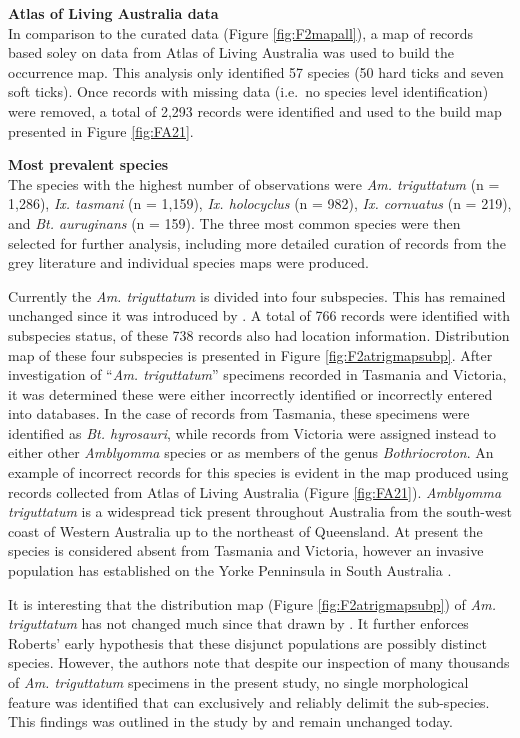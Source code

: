 \documentclass[a4paper, nobind]{templates/ociamthesis}
\begin{document}
\textbf{Atlas of Living Australia data}\\
In comparison to the curated data (Figure \ref{fig:F2mapall}), a map of records based soley on data from Atlas of Living Australia was used to build the occurrence map.
This analysis only identified 57 species (50 hard ticks and seven soft ticks).
Once records with missing data (i.e.~no species level identification) were removed, a total of 2,293 records were identified and used to the build map presented in Figure \ref{fig:FA21}.

\textbf{Most prevalent species}\\
The species with the highest number of observations were \emph{Am. triguttatum} (n = 1,286), \emph{Ix. tasmani} (n = 1,159), \emph{Ix. holocyclus} (n = 982), \emph{Ix. cornuatus} (n = 219), and \emph{Bt. auruginans} (n = 159).
The three most common species were then selected for further analysis, including more detailed curation of records from the grey literature and individual species maps were produced.

Currently the \emph{Am. triguttatum} is divided into four subspecies.
This has remained unchanged since it was introduced by \textcite{robertsStatusMorphologicallyDivergent1962}.
A total of 766 records were identified with subspecies status, of these 738 records also had location information.
Distribution map of these four subspecies is presented in Figure \ref{fig:F2atrigmapsubp}.
After investigation of ``\emph{Am. triguttatum}'' specimens recorded in Tasmania and Victoria,
it was determined these were either incorrectly identified or incorrectly entered into databases.
In the case of records from Tasmania, these specimens were identified as \emph{Bt. hyrosauri}, while records from Victoria were assigned instead to either other \emph{Amblyomma} species or as members of the genus \emph{Bothriocroton}.
An example of incorrect records for this species is evident in the map produced using records collected from Atlas of Living Australia (Figure \ref{fig:FA21}).
\emph{Amblyomma triguttatum} is a widespread tick present throughout Australia from the south-west coast of Western Australia up to the northeast of Queensland.
At present the species is considered absent from Tasmania and Victoria, however an invasive population has established on the Yorke Penninsula in South Australia \autocite{mcdiarmidRangeExpansionTick2000}.

It is interesting that the distribution map (Figure \ref{fig:F2atrigmapsubp}) of \emph{Am. triguttatum} has not changed much since that drawn by \textcite{robertsStatusMorphologicallyDivergent1962}.
It further enforces Roberts' early hypothesis that these disjunct populations are possibly distinct species.
However, the authors note that despite our inspection of many thousands of \emph{Am. triguttatum} specimens in the present study, no single morphological feature was identified that can exclusively and reliably delimit the sub-species.
This findings was outlined in the study by \textcite{robertsStatusMorphologicallyDivergent1962} and remain unchanged today.
\end{document}
